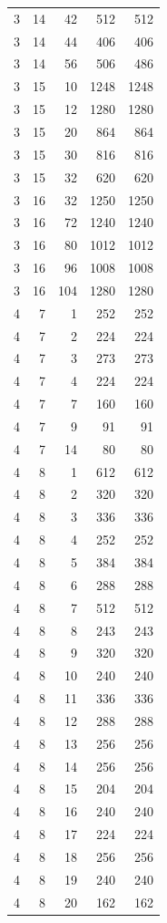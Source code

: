 \begin{longtable}{rrrrr}
3 & 14 & 42 & 512 & 512 \\
3 & 14 & 44 & 406 & 406 \\
3 & 14 & 56 & 506 & 486 \\
3 & 15 & 10 & 1248 & 1248 \\
3 & 15 & 12 & 1280 & 1280 \\
3 & 15 & 20 & 864 & 864 \\
3 & 15 & 30 & 816 & 816 \\
3 & 15 & 32 & 620 & 620 \\
3 & 16 & 32 & 1250 & 1250 \\
3 & 16 & 72 & 1240 & 1240 \\
3 & 16 & 80 & 1012 & 1012 \\
3 & 16 & 96 & 1008 & 1008 \\
3 & 16 & 104 & 1280 & 1280 \\
4 & 7 & 1 & 252 & 252 \\
4 & 7 & 2 & 224 & 224 \\
4 & 7 & 3 & 273 & 273 \\
4 & 7 & 4 & 224 & 224 \\
4 & 7 & 7 & 160 & 160 \\
4 & 7 & 9 & 91 & 91 \\
4 & 7 & 14 & 80 & 80 \\
4 & 8 & 1 & 612 & 612 \\
4 & 8 & 2 & 320 & 320 \\
4 & 8 & 3 & 336 & 336 \\
4 & 8 & 4 & 252 & 252 \\
4 & 8 & 5 & 384 & 384 \\
4 & 8 & 6 & 288 & 288 \\
4 & 8 & 7 & 512 & 512 \\
4 & 8 & 8 & 243 & 243 \\
4 & 8 & 9 & 320 & 320 \\
4 & 8 & 10 & 240 & 240 \\
4 & 8 & 11 & 336 & 336 \\
4 & 8 & 12 & 288 & 288 \\
4 & 8 & 13 & 256 & 256 \\
4 & 8 & 14 & 256 & 256 \\
4 & 8 & 15 & 204 & 204 \\
4 & 8 & 16 & 240 & 240 \\
4 & 8 & 17 & 224 & 224 \\
4 & 8 & 18 & 256 & 256 \\
4 & 8 & 19 & 240 & 240 \\
4 & 8 & 20 & 162 & 162 \\

\end{longtable}
